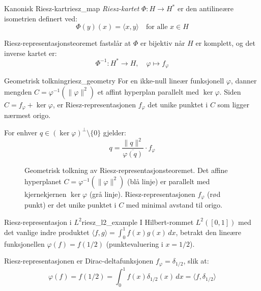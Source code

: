 \documentclass[../../main.tex]{subfiles}
\begin{document}
\begin{definition}{Kanonisk Riesz-kart}{riesz_map}
    \emph{Riesz-kartet} $\Phi : H \to H^\ast$ er den antilineære isometrien definert ved:
    \begin{equation}
        \Phi(y)(x) = \langle x, y \rangle \quad \text{for alle } x \in H
    \end{equation}

    Riesz-representasjonsteoremet fastslår at $\Phi$ er bijektiv når $H$ er komplett, og det inverse kartet er:
    \begin{equation}
        \Phi^{-1} : H^\ast \to H, \quad \varphi \mapsto f_\varphi
    \end{equation}
\end{definition}

\begin{remark}{Geometrisk tolkning}{riesz_geometry}
    For en ikke-null lineær funksjonell $\varphi$, danner mengden $C = \varphi^{-1}(\|\varphi\|^2)$ et affint hyperplan parallelt med $\ker \varphi$. Siden $C = f_\varphi + \ker \varphi$, er Riesz-representasjonen $f_\varphi$ det unike punktet i $C$ som ligger nærmest origo.

    For enhver $q \in (\ker \varphi)^\perp \setminus \{0\}$ gjelder:
    \begin{equation}
        q = \frac{\|q\|^2}{\overline{\varphi(q)}} \cdot f_\varphi
    \end{equation}
\end{remark}

\begin{figure}
    \centering
    
    \caption{Geometrisk tolkning av Riesz-representasjonsteoremet. Det affine hyperplanet $C = \varphi^{-1}(\|\varphi\|^2)$ (blå linje) er parallelt med kjernekjernen $\ker \varphi$ (grå linje). Riesz-representasjonen $f_\varphi$ (rød punkt) er det unike punktet i $C$ med minimal avstand til origo.}
    \label{fig:riesz_representation}
\end{figure}

\begin{example}{Riesz-representasjon i $L^2$}{riesz_l2_example}
    I Hilbert-rommet $L^2([0,1])$ med det vanlige indre produktet $\langle f, g \rangle = \int_0^1 f(x)g(x) \, dx$, betrakt den lineære funksjonellen $\varphi(f) = f(1/2)$ (punktevaluering i $x = 1/2$).

    Riesz-representasjonen er Dirac-deltafunksjonen $f_\varphi = \delta_{1/2}$, slik at:
    \begin{equation}
        \varphi(f) = f(1/2) = \int_0^1 f(x) \delta_{1/2}(x) \, dx = \langle f, \delta_{1/2} \rangle
    \end{equation}
\end{example}
\end{document}
